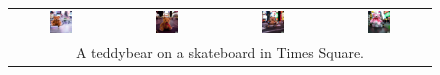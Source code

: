 \begin{figure}[ht!]
\begin{tabular}{cccc}
        \includegraphics[width=0.24\textwidth]{figures/cross/bear_0.jpg} &
        \includegraphics[width=0.24\textwidth]{figures/cross/bear_1.jpg} &
        \includegraphics[width=0.24\textwidth]{figures/cross/bear_2.jpg} &
        \includegraphics[width=0.24\textwidth]{figures/cross/bear_3.jpg} \\
        \multicolumn{4}{c}{\small A teddybear on a skateboard in Times Square.}\\


\end{tabular}
\end{figure}
